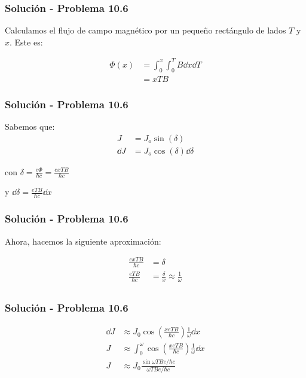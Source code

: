 \documentclass[10pt]{beamer}
\begin{document}
\begin{frame}
    \frametitle{Solución - Problema 10.6}

    Calculamos el flujo de campo magnético por un pequeño rectángulo de lados $T$ y $x$. Este es:

    \begin{align*}
        \Phi(x) &= \int_0^x\int_0^T B \dd x \dd T\\
            &= xTB\tag{2}\label{eq:flux}
    \end{align*}

\end{frame}

\begin{frame}
    \frametitle{Solución - Problema 10.6}

    Sabemos que:
    \begin{align*}
        J &= J_o\sin(\delta)\\
        \dd J &= J_o \cos(\delta)\dd \delta
    \end{align*}

    con $\delta =  \frac{e\Phi}{\hbar c} = \frac{exTB}{\hbar c}$

    y $\dd \delta = \frac{eTB}{\hbar c}\dd x$

\end{frame}

\begin{frame}
    \frametitle{Solución - Problema 10.6}

    Ahora, hacemos la siguiente aproximación:

    \begin{align*}
        \frac{exTB}{\hbar c} &= \delta\\
        \frac{eTB}{\hbar c} &=\frac{\delta}{x}\approx\frac{1}{\omega}\\
    \end{align*}

\end{frame}

\begin{frame}
    \frametitle{Solución - Problema 10.6}

    \begin{align*}
        \dd J &\approx J_0 \cos\left(\frac{xeTB}{\hbar c}\right)\frac{1}{\omega}\dd x\\
        J & \approx \int_0^\omega \cos\left(\frac{xeTB}{\hbar c}\right)\frac{1}{\omega}\dd x\\
        J &\approx J_0\frac{\sin{\omega T B e / \hbar c}}{\omega T B e/\hbar c}
    \end{align*}

\end{frame}
\end{document}
